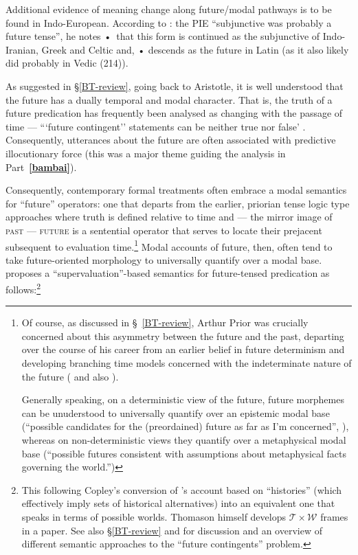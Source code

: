 Additional evidence of meaning change along future/modal pathways is to be found in Indo-European. According to \citet[106]{Fortson2010}: the \acrshort{PIE} ``subjunctive was probably a future tense'', he notes •~that this form is continued as the subjunctive of Indo-Iranian, Greek and Celtic and, • descends as the future in Latin (as it also likely did probably in Vedic (214)).



As suggested in \S\thinspace\ref{BT-review}, going back to Aristotle, it is well understood that the future has a dually temporal and modal character. That is, the truth of a future predication has frequently been analysed as changing with the passage of time --- ```future contingent'' statements can be neither true nor false' \citep[265]{Thomason1970}. Consequently, utterances about the future are often associated with predictive illocutionary force (this was a major theme guiding the analysis in Part~\textbf{\ref{bambai}}).

Consequently, contemporary formal treatments often embrace a modal semantics for ``future'' operators: one that departs from the earlier, priorian tense logic type approaches where truth is defined relative to time and --- the mirror image of \textsc{past} --- \textsc{future} is a sentential operator that serves to locate their prejacent subsequent to evaluation time.\footnote{Of course, as discussed in \S~\ref{BT-review}, Arthur Prior was crucially concerned about this asymmetry between the future and the past, departing over the course of his career from an earlier belief in future determinism and developing branching time models concerned with the indeterminate nature of the future (\citealp[see][]{Copeland2020} and also \citealp[13]{Copley2009}).
	
	Generally speaking, on a deterministic view of the future, future morphemes can be unuderstood to universally quantify over an epistemic modal base (``possible candidates for the (preordained) future as far as I'm concerned'', \citealp[\textit{cf.}][]{Giannakidou2018}), whereas on non-deterministic views they quantify over a metaphysical modal base (``possible futures consistent with assumptions about metaphysical facts governing the world.'')} Modal accounts of future, then, often tend to take future-oriented morphology to universally quantify over a modal base. \citet[274]{Thomason1970} proposes a ``supervaluation''-based semantics for future-tensed predication as follows:\footnote{This following Copley's \citeyearpar[14]{Copley2009} conversion of \citeauthor{Thomason1970}'s account based on ``histories'' (which effectively imply sets of historical alternatives) into an equivalent one that speaks in terms of possible worlds. Thomason himself develops $ \mathcal{T\times W} $ frames in a \citeyear{Thomason1984} paper. See also \S\ref{BT-review} and \citep{Stojanovic2014} for discussion and an overview of different semantic approaches to the ``future contingents'' problem.}

